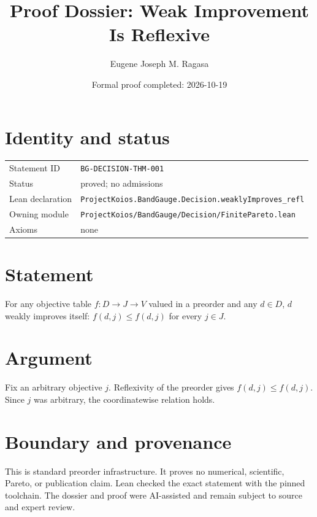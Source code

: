 \documentclass[11pt]{article}
\title{Proof Dossier: Weak Improvement Is Reflexive}
\author{Eugene Joseph M. Ragasa}
\date{Formal proof completed: 2026-10-19}
\begin{document}
\maketitle
\section{Identity and status}
\begin{tabularx}{\textwidth}{@{}lX@{}}\toprule
Statement ID & \texttt{BG-DECISION-THM-001} \\
Status & proved; no admissions \\
Lean declaration & \texttt{ProjectKoios.BandGauge.Decision.weaklyImproves\_refl} \\
Owning module & \texttt{ProjectKoios/BandGauge/Decision/FinitePareto.lean} \\
Axioms & none \\
\bottomrule\end{tabularx}
\section{Statement}
For any objective table $f:D\to J\to V$ valued in a preorder and any $d\in D$,
$d$ weakly improves itself: $f(d,j)\le f(d,j)$ for every $j\in J$.
\section{Argument}
Fix an arbitrary objective $j$. Reflexivity of the preorder gives
$f(d,j)\le f(d,j)$. Since $j$ was arbitrary, the coordinatewise relation holds.
\section{Boundary and provenance}
This is standard preorder infrastructure. It proves no numerical, scientific, Pareto,
or publication claim. Lean checked the exact statement with the pinned toolchain. The
dossier and proof were AI-assisted and remain subject to source and expert review.
\end{document}
